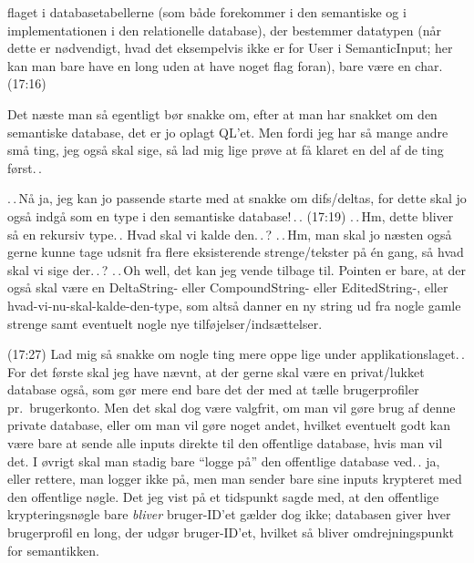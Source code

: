 \documentclass{report}
\begin{document}
flaget i databasetabellerne (som både forekommer i den semantiske og i implementationen i den relationelle database), der bestemmer datatypen (når dette er nødvendigt, hvad det eksempelvis ikke er for User i SemanticInput; her kan man bare have en long uden at have noget flag foran), bare være en char. (17:16)

Det næste man så egentligt bør snakke om, efter at man har snakket om den semantiske database, det er jo oplagt QL'et. Men fordi jeg har så mange andre små ting, jeg også skal sige, så lad mig lige prøve at få klaret en del af de ting først.\,. 

.\,.\,Nå ja, jeg kan jo passende starte med at snakke om difs/deltas, for dette skal jo også indgå som en type i den semantiske database!\,.\,. (17:19) .\,.\,Hm, dette bliver så en rekursiv type.\,. Hvad skal vi kalde den.\,.\,? .\,.\,Hm, man skal jo næsten også gerne kunne tage udsnit fra flere eksisterende strenge/tekster på én gang, så hvad skal vi sige der.\,.\,? .\,.\,Oh well, det kan jeg vende tilbage til. Pointen er bare, at der også skal være en DeltaString- eller CompoundString- eller EditedString-, eller hvad-vi-nu-skal-kalde-den-type, som altså danner en ny string ud fra nogle gamle strenge samt eventuelt nogle nye tilføjelser/indsættelser. 

(17:27) Lad mig så snakke om nogle ting mere oppe lige under applikationslaget.\,. For det første skal jeg have nævnt, at der gerne skal være en privat/lukket database også, som gør mere end bare det der med at tælle brugerprofiler pr.\ brugerkonto. Men det skal dog være valgfrit, om man vil gøre brug af denne private database, eller om man vil gøre noget andet, hvilket eventuelt godt kan være bare at sende alle inputs direkte til den offentlige database, hvis man vil det. I øvrigt skal man stadig bare ``logge på'' den offentlige database ved.\,. ja, eller rettere, man logger ikke på, men man sender bare sine inputs krypteret med den offentlige nøgle. Det jeg vist på et tidspunkt sagde med, at den offentlige krypteringsnøgle bare \emph{bliver} bruger-ID'et gælder dog ikke; databasen giver hver brugerprofil en long, der udgør bruger-ID'et, hvilket så bliver omdrejningspunkt for semantikken. 
\end{document}
